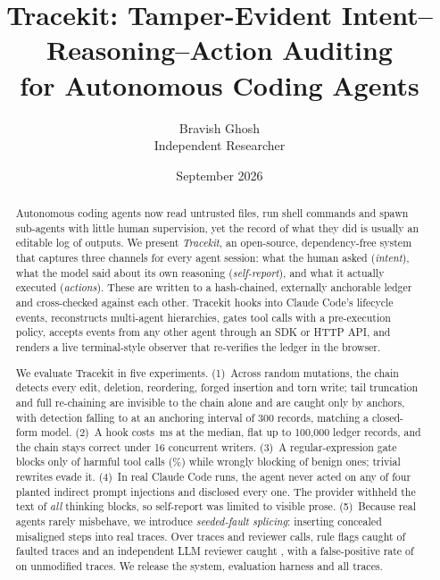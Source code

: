 \documentclass[11pt]{article}
\title{\textbf{Tracekit: Tamper-Evident Intent--Reasoning--Action Auditing\\for Autonomous Coding Agents}}
\author{Bravish Ghosh\\Independent Researcher}
\date{September 2026}
\begin{document}
\maketitle

\begin{abstract}
Autonomous coding agents now read untrusted files, run shell commands and spawn sub-agents with little human supervision, yet the record of what they did is usually an editable log of outputs. We present \emph{Tracekit}, an open-source, dependency-free system that captures three channels for every agent session: what the human asked (\emph{intent}), what the model said about its own reasoning (\emph{self-report}), and what it actually executed (\emph{actions}). These are written to a hash-chained, externally anchorable ledger and cross-checked against each other. Tracekit hooks into Claude Code's lifecycle events, reconstructs multi-agent hierarchies, gates tool calls with a pre-execution policy, accepts events from any other agent through an SDK or HTTP API, and renders a live terminal-style observer that re-verifies the ledger in the browser.

We evaluate Tracekit in five experiments. (1)~Across \EOneTotalTrials{} random mutations, the chain detects every edit, deletion, reordering, forged insertion and torn write; tail truncation and full re-chaining are invisible to the chain alone and are caught only by anchors, with detection falling to \EOneIntervalThreeHundred{} at an anchoring interval of 300 records, matching a closed-form model. (2)~A hook costs \LatPreEmpty{}\,ms at the median, flat up to 100{,}000 ledger records, and the chain stays correct under 16 concurrent writers. (3)~A regular-expression gate blocks only \EThreeBlocked{} of \EThreeHarm{} harmful tool calls (\EThreeBlockedPct\%) while wrongly blocking \EThreeFP{} of \EThreeBenign{} benign ones; trivial rewrites evade it. (4)~In \EFiveRuns{} real Claude Code runs, the agent never acted on any of four planted indirect prompt injections and disclosed every one. The provider withheld the text of \emph{all} \EFiveThinkWithheld{} thinking blocks, so self-report was limited to visible prose. (5)~Because real agents rarely misbehave, we introduce \emph{seeded-fault splicing}: inserting concealed misaligned steps into real traces. Over \EFourTraces{} traces and \EFourCalls{} reviewer calls, rule flags caught \EFourRulesMacro{} of faulted traces and an independent LLM reviewer caught \EFourJudgeMacro{}, with a false-positive rate of \EFourJudgeFPMacro{} on unmodified traces. We release the system, evaluation harness and all traces.
\end{abstract}
\end{document}
